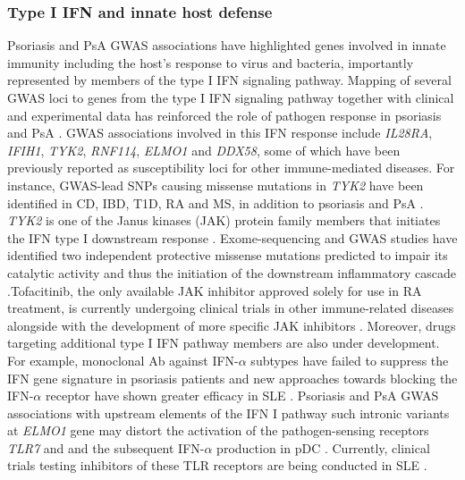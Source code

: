 \subsubsection*{Type I IFN and innate host defense}
Psoriasis and PsA GWAS associations have highlighted genes involved in innate immunity including the host’s response to virus and bacteria, importantly represented by members of the type I IFN signaling pathway. Mapping of several GWAS loci to genes from the type I IFN signaling pathway together with clinical and experimental data has reinforced the role of pathogen response in psoriasis and PsA \parencite{Nextle2005}. GWAS associations involved in this IFN response include \textit{IL28RA}, \textit{IFIH1}, \textit{TYK2}, \textit{RNF114}, \textit{ELMO1} and \textit{DDX58}, some of which have been previously reported as susceptibility loci for other immune-mediated diseases. For instance, GWAS-lead SNPs causing missense mutations in \textit{TYK2} have been identified in CD, IBD, T1D, RA and MS, in addition to psoriasis and PsA \parencite{ImmunoBase}. \textit{TYK2} is one of the Janus kinases (JAK) protein family members that initiates the IFN type I downstream response \parencite{Calamonici1994}. Exome-sequencing and GWAS studies have identified two independent protective missense mutations predicted to impair its catalytic activity and thus the initiation of the downstream inflammatory cascade \parencite{Strange2010, Tsoi2012, Dand2017}.Tofacitinib, the only available JAK inhibitor approved solely for use in RA treatment, is currently undergoing clinical trials in other immune-related diseases alongside with the development of more specific JAK inhibitors \parencite{Baker2017}. Moreover, drugs targeting additional type I IFN pathway members are also under development. For example, monoclonal Ab against IFN-$\alpha$ subtypes have failed to suppress the IFN gene signature in psoriasis patients and new approaches towards blocking the IFN-$\alpha$ receptor have shown greater efficacy in SLE \parencite{Furie2017}. Psoriasis and PsA GWAS associations with upstream elements of the IFN I pathway such intronic variants at \textit{ELMO1} gene may distort the activation of the pathogen-sensing receptors \textit{TLR7} and \parencite{TLR9} and the subsequent IFN-$\alpha$ production in pDC \parencite{Tsoi2012}. Currently, clinical trials testing inhibitors of these TLR receptors are being conducted in SLE \parencite{Baker2017}.



